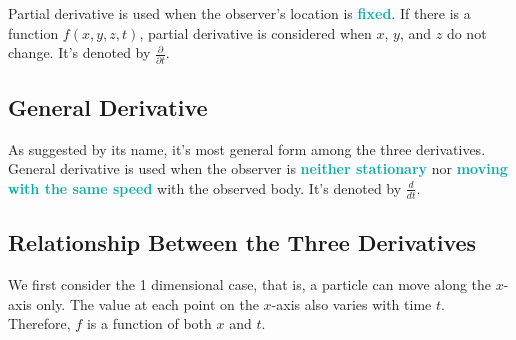 \documentclass[twoside]{article}
\newcommand{\highlightbluetext}[1]{\textcolor[HTML]{09ACA6}{\textbf{#1}}}
\numberwithin{equation}{section}
\begin{document}
	Partial derivative is used when the observer's location is \highlightbluetext{fixed}. If there is a function $f(x, y, z, t)$, partial derivative is considered when $x$, $y$, and $z$ do not change. It's denoted by $\frac{\partial}{\partial t}$.
	
	\subsection{General Derivative}
	\label{subsec:GeneralDerivative}
	
	As suggested by its name, it's most general form among the three derivatives. General derivative is used when the observer is \highlightbluetext{neither stationary} nor \highlightbluetext{moving with the same speed} with the observed body. It's denoted by $\frac{d}{dt}$.
	
	\subsection{Relationship Between the Three Derivatives}
	\label{subsec:RelationshipBetweenTheThreeDerivatives}
	
	We first consider the 1 dimensional case, that is, a particle can move along the $x$-axis only. The value at each point on the $x$-axis also varies with time $t$. Therefore, $f$ is a function of both $x$ and $t$.
	
\end{document}
